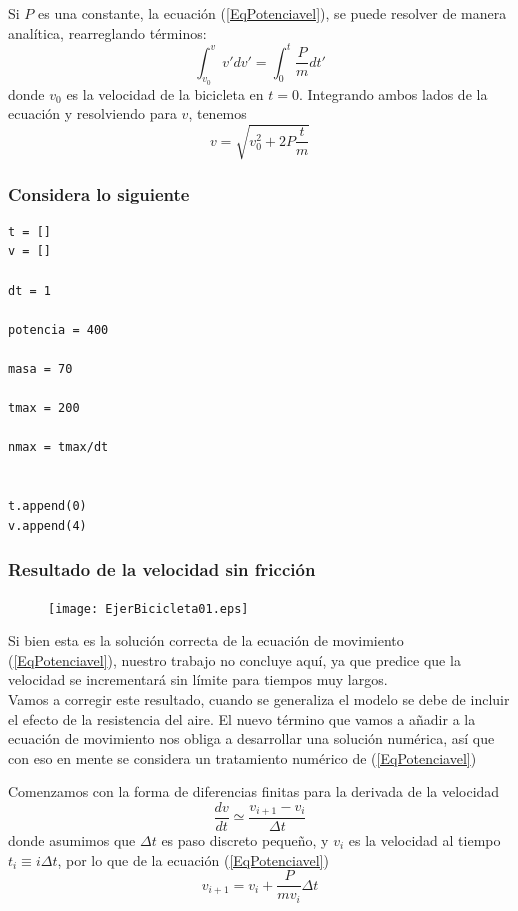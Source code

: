 \begin{frame}
Si $P$ es una constante, la ecuación (\ref{EqPotenciavel}), se puede resolver de manera analítica, rearreglando términos:
\begin{equation}\label{EqIntegral}
\int_{v_{0}}^{v} v' dv' = \int_{0}^{t} \dfrac{P}{m} dt'
\end{equation}
donde $v_{0}$ es la velocidad de la bicicleta en $t=0$. Integrando ambos lados de la ecuación y resolviendo para $v$, tenemos
\begin{equation}\label{Eqvres}
v = \sqrt{v_{0}^{2} + 2 P \dfrac{t}{m}}
\end{equation}
\end{frame}
\begin{frame}[fragile]
\frametitle{Considera lo siguiente}
\begin{verbatim}
t = []
v = []

dt = 1

potencia = 400

masa = 70

tmax = 200

nmax = tmax/dt


t.append(0)
v.append(4)
\end{verbatim}
\end{frame}
\begin{frame}
\frametitle{Resultado de la velocidad sin fricción}
\begin{figure}
	\centering
	\texttt{[image: EjerBicicleta01.eps]}
\end{figure}
\end{frame}
\begin{frame}
Si bien esta es la solución correcta de la ecuación de movimiento (\ref{EqPotenciavel}), nuestro trabajo no concluye aquí, ya que predice que la velocidad se incrementará sin límite para tiempos muy largos.
\\
\medskip
Vamos a corregir este resultado, cuando se generaliza el modelo se debe de incluir el efecto de la resistencia del aire. El nuevo término que vamos a añadir a la ecuación de movimiento nos obliga a desarrollar una solución numérica, así que con eso en mente se considera un tratamiento numérico de (\ref{EqPotenciavel})
\end{frame}
\begin{frame}
Comenzamos con la forma de diferencias finitas para la derivada de la velocidad
\begin{equation}\label{Eqderivada}
\dfrac{dv}{dt} \simeq \dfrac{v_{i+1}-v_{i}}{\Delta t}
\end{equation}
donde asumimos que $\Delta t$ es paso discreto pequeño, y $v_{i}$ es la velocidad al tiempo $t_{i} \equiv i \Delta t$, por lo que de la ecuación (\ref{EqPotenciavel})
\begin{equation}\label{Eqveli+1}
v_{i+1} = v_{i} + \dfrac{P}{m v_{i}} \Delta t
\end{equation}
\end{frame}
